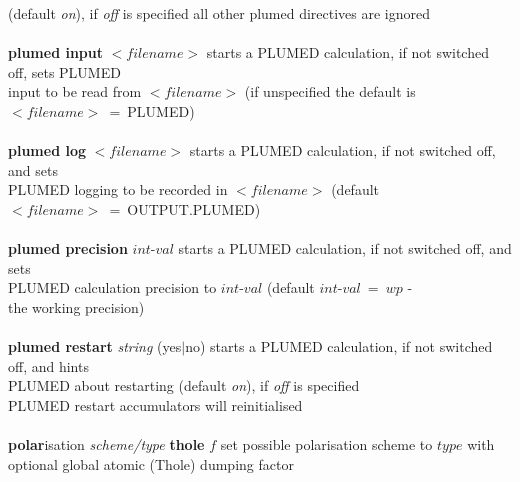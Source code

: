 \begin{tabbing}
\>                                              \> (default {\em on}), if {\em off} is specified all other plumed directives are ignored \\
\>                                              \> \\
\> {\bf plumed input} $<$$filename$$>$          \> starts a PLUMED calculation, if not switched off, sets PLUMED \\
\>                                              \> input to be read from $<$$filename$$>$ (if unspecified the default is \\
\>                                              \> $<$$filename$$>$~=~PLUMED) \\
\>                                              \> \\
\> {\bf plumed log} $<$$filename$$>$            \> starts a PLUMED calculation, if not switched off, and sets \\
\>                                              \> PLUMED logging to be recorded in $<$$filename$$>$ (default \\
\>                                              \> $<$$filename$$>$~=~OUTPUT.PLUMED) \\
\>                                              \> \\
\> {\bf plumed precision} $int$-$val$           \> starts a PLUMED calculation, if not switched off, and sets \\
\>                                              \> PLUMED calculation precision to $int$-$val$ (default $int$-$val$~=~$wp$ - \\
\>                                              \> the \D working precision) \\
\>                                              \> \\
\> {\bf plumed restart} {\em string} (yes$|$no) \> starts a PLUMED calculation, if not switched off, and hints \\
\>                                              \> PLUMED about restarting (default {\em on}), if {\em off} is specified \\
\>                                              \> PLUMED restart accumulators will reinitialised \\
\>                                              \> \\
\> {\bf polar}isation {\em scheme/type} {\bf thole} $f$ \> set possible polarisation scheme to $type$ with \\
\>                                              \> optional global atomic (Thole) dumping factor \\

\end{tabbing}
